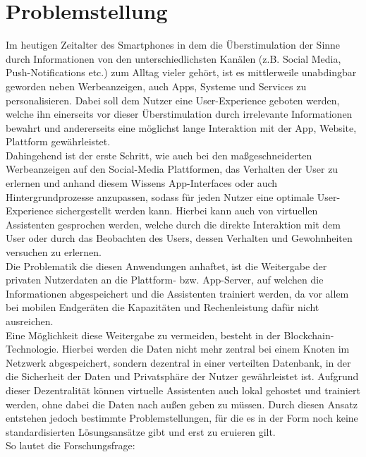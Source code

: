 \section{Problemstellung}
Im heutigen Zeitalter des Smartphones in dem die Überstimulation \cite{SMPUse} der Sinne durch Informationen von den unterschiedlichsten Kanälen (z.B. Social Media, Push-Notifications etc.) zum Alltag vieler gehört, ist es mittlerweile unabdingbar geworden neben Werbeanzeigen, auch Apps, Systeme und Services zu personalisieren. Dabei soll dem Nutzer eine User-Experience geboten werden, welche ihn einerseits vor dieser Überstimulation durch irrelevante Informationen bewahrt und andererseits eine möglichst lange Interaktion mit der App, Website, Plattform gewährleistet. \\
Dahingehend ist der erste Schritt, wie auch bei den maßgeschneiderten Werbeanzeigen auf den Social-Media Plattformen, das Verhalten der User zu erlernen und anhand diesem Wissens App-Interfaces oder auch Hintergrundprozesse anzupassen, sodass für jeden Nutzer eine optimale User-Experience sichergestellt werden kann. Hierbei kann auch von virtuellen Assistenten gesprochen werden, welche durch die direkte Interaktion mit dem User oder durch das Beobachten des Users, dessen Verhalten und Gewohnheiten versuchen zu erlernen. \\
Die Problematik die diesen Anwendungen anhaftet, ist die Weitergabe der privaten Nutzerdaten an die Plattform- bzw. App-Server, auf welchen die Informationen abgespeichert und die Assistenten trainiert werden, da vor allem bei mobilen Endgeräten die Kapazitäten und Rechenleistung dafür nicht ausreichen. \\
Eine Möglichkeit diese Weitergabe zu vermeiden, besteht in der Blockchain-Technologie. Hierbei werden die Daten nicht mehr zentral bei einem Knoten im Netzwerk abgespeichert, sondern dezentral in einer verteilten Datenbank, in der die Sicherheit der Daten und Privatsphäre der Nutzer gewährleistet ist. Aufgrund dieser Dezentralität können virtuelle Assistenten auch lokal gehostet und trainiert werden, ohne dabei die Daten nach außen geben zu müssen. Durch diesen Ansatz entstehen jedoch bestimmte Problemstellungen, für die es in der Form noch keine standardisierten Lösungsansätze gibt und erst zu eruieren gilt. \\
So lautet die Forschungsfrage:  \\
